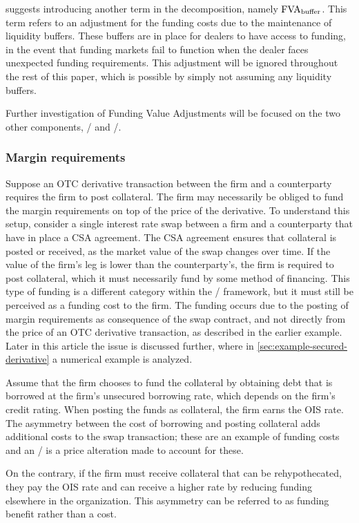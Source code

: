 \documentclass[main.tex]{subfiles}
\begin{document}
        \textcite{KPMGFVA} suggests introducing another term in the decomposition, namely
        $\FVA/_{\text{buffer}}$.
        This term refers to an adjustment for the funding costs
        due to the maintenance of liquidity buffers. 
        These buffers are in place for dealers to have access to funding, in the event
        that funding markets fail to function when the dealer faces unexpected funding requirements.
        This adjustment will be ignored throughout the rest of this paper, 
        which is possible by simply not assuming any liquidity buffers. 
        
        Further investigation of Funding Value Adjustments will be focused on the two other components,
        \FCA/ and \FBA/.

        \subsubsection*{Margin requirements}
            Suppose an OTC derivative transaction between the firm and a counterparty requires the firm to post collateral.
            The firm may necessarily be obliged to fund the margin requirements on top of the price of the derivative.
            To understand this setup,
            consider a single interest rate swap between a firm and a counterparty that have in place a CSA agreement.
            The CSA agreement ensures that collateral is posted or received,
            as the market value of the swap changes over time.
            If the value of the firm's leg is lower than the counterparty's,
            the firm is required to post collateral, 
            which it must necessarily fund by some method of financing.
            This type of funding is a different category within the \FVA/ framework, 
            but it must still be perceived as a funding cost to the firm.
            The funding occurs due to the posting of margin requirements as consequence of the swap contract,
            and not directly from the price of an OTC derivative transaction,
            as described in the earlier example.
            Later in this article the issue is discussed further, 
            where in \cref{sec:example-secured-derivative} a numerical example is analyzed.
            
            Assume that the firm chooses to fund the collateral by obtaining debt
            that is borrowed at the firm's unsecured borrowing rate, which depends on the firm's credit rating.
            When posting the funds as collateral, the firm earns the OIS rate.
            The asymmetry between the cost of borrowing and posting collateral
            adds additional costs to the swap transaction; 
            these are an example of funding costs and an \FVA/ is a price alteration made to account for these.

            On the contrary, if the firm must receive collateral that can be rehypothecated,
            they pay the OIS rate and can receive a higher rate
            by reducing funding elsewhere in the organization.
            This asymmetry can be referred to as funding benefit rather than a cost.
\end{document}
